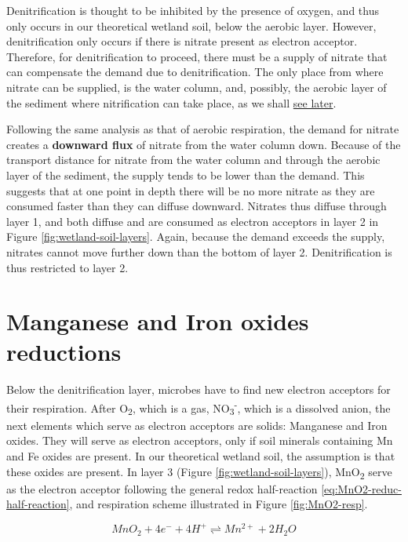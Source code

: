 \documentclass[]{book}
\theoremstyle{definition}
\theoremstyle{definition}
\theoremstyle{definition}
\theoremstyle{remark}
\begin{document}
Denitrification is thought to be inhibited by the presence of oxygen,
and thus only occurs in our theoretical wetland soil, below the aerobic
layer. However, denitrification only occurs if there is nitrate present
as electron acceptor. Therefore, for denitrification to proceed, there
must be a supply of nitrate that can compensate the demand due to
denitrification. The only place from where nitrate can be supplied, is
the water column, and, possibly, the aerobic layer of the sediment where
nitrification can take place, as we shall
\protect\hyperlink{nitrification}{see later}.

Following the same analysis as that of aerobic respiration, the demand
for nitrate creates a \textbf{downward flux} of nitrate from the water
column down. Because of the transport distance for nitrate from the
water column and through the aerobic layer of the sediment, the supply
tends to be lower than the demand. This suggests that at one point in
depth there will be no more nitrate as they are consumed faster than
they can diffuse downward. Nitrates thus diffuse through layer 1, and
both diffuse and are consumed as electron acceptors in layer 2 in Figure
\ref{fig:wetland-soil-layers}. Again, because the demand exceeds the
supply, nitrates cannot move further down than the bottom of layer 2.
Denitrification is thus restricted to layer 2.

\section{Manganese and Iron oxides
reductions}\label{manganese-and-iron-oxides-reductions}

Below the denitrification layer, microbes have to find new electron
acceptors for their respiration. After O\textsubscript{2}, which is a
gas, NO\textsubscript{3}\textsuperscript{-}, which is a dissolved anion,
the next elements which serve as electron acceptors are solids:
Manganese and Iron oxides. They will serve as electron acceptors, only
if soil minerals containing Mn and Fe oxides are present. In our
theoretical wetland soil, the assumption is that these oxides are
present. In layer 3 (Figure \ref{fig:wetland-soil-layers}),
MnO\textsubscript{2} serve as the electron acceptor following the
general redox half-reaction \eqref{eq:MnO2-reduc-half-reaction}, and
respiration scheme illustrated in Figure \ref{fig:MnO2-resp}.

\begin{equation}
MnO_2 + 4 e^- + 4 H^+ \rightleftharpoons Mn^{2+} + 2 H_2O
\label{eq:MnO2-reduc-half-reaction}
\end{equation}
\end{document}
